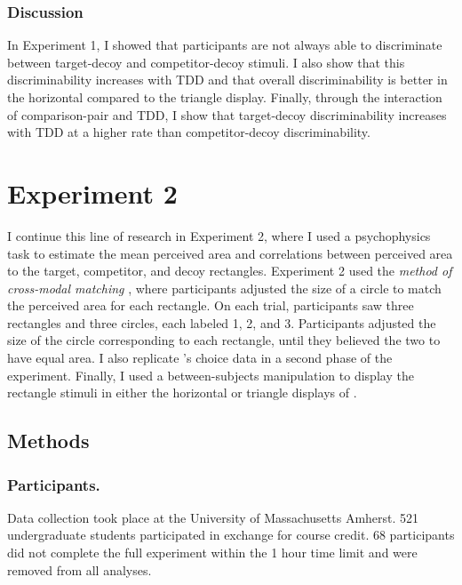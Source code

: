 \subsubsection{Discussion}
In Experiment 1, I showed that participants are not always able to discriminate between target-decoy and competitor-decoy stimuli. I also show that this discriminability increases with TDD and that overall discriminability is better in the horizontal compared to the triangle display. Finally, through the interaction of comparison-pair and TDD, I show that target-decoy discriminability increases with TDD at a higher rate than competitor-decoy discriminability. 

\section{Experiment 2}
I continue this line of research in Experiment 2, where I used a psychophysics task to estimate the mean perceived area and correlations between perceived area to the target, competitor, and decoy rectangles. Experiment 2 used the \textit{method of cross-modal matching} \parencite{stevensCrossmodalityMatchingBrightness1965}, where participants adjusted the size of a circle to match the perceived area for each rectangle. On each trial, participants saw three rectangles and three circles, each labeled 1, 2, and 3. Participants adjusted the size of the circle corresponding to each rectangle, until they believed the two to have equal area. I also replicate \textcite{spektorWhenGoodLooks2018b}'s choice data in a second phase of the experiment. Finally, I used a between-subjects manipulation to display the rectangle stimuli in either the horizontal or triangle displays of \textcite{spektorWhenGoodLooks2018b}.

\subsection{Methods}
\subsubsection{Participants.}
Data collection took place at the University of Massachusetts Amherst. 521 undergraduate students participated in exchange for course credit. 68 participants did not complete the full experiment within the 1 hour time limit and were removed from all analyses. 

